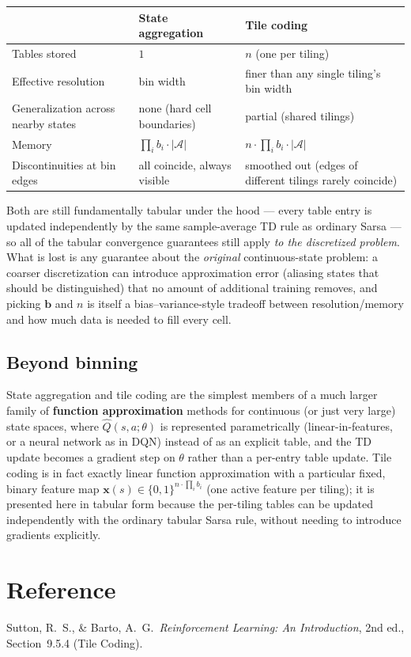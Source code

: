 \documentclass[11pt]{article}
\begin{document}
\begin{center}
\begin{tabular}{@{}p{4.1cm}p{4.6cm}p{4.6cm}@{}}
\toprule
 & State aggregation & Tile coding \\
\midrule
Tables stored & $1$ & $n$ (one per tiling) \\
Effective resolution & bin width & finer than any single tiling's bin width \\
Generalization across nearby states & none (hard cell boundaries) & partial (shared tilings) \\
Memory & $\prod_i b_i \cdot |\mathcal{A}|$ & $n \cdot \prod_i b_i \cdot |\mathcal{A}|$ \\
Discontinuities at bin edges & all coincide, always visible & smoothed out (edges of different tilings rarely coincide) \\
\bottomrule
\end{tabular}
\end{center}

Both are still fundamentally tabular under the hood — every table entry is
updated independently by the same sample-average TD rule as ordinary
Sarsa — so all of the tabular convergence guarantees still apply
\emph{to the discretized problem}. What is lost is any guarantee about the
\emph{original} continuous-state problem: a coarser discretization can
introduce approximation error (aliasing states that should be
distinguished) that no amount of additional training removes, and picking
$\mathbf{b}$ and $n$ is itself a bias--variance-style tradeoff between
resolution/memory and how much data is needed to fill every cell.

\subsection{Beyond binning}

State aggregation and tile coding are the simplest members of a much
larger family of \textbf{function approximation} methods for continuous
(or just very large) state spaces, where $\hat{Q}(s,a;\theta)$ is
represented parametrically (linear-in-features, or a neural network as in
DQN) instead of as an explicit table, and the TD update becomes a gradient
step on $\theta$ rather than a per-entry table update. Tile coding is in
fact exactly linear function approximation with a particular fixed,
binary feature map $\mathbf{x}(s) \in \{0,1\}^{n \cdot \prod_i b_i}$ (one
active feature per tiling); it is presented here in tabular form because
the per-tiling tables can be updated independently with the ordinary
tabular Sarsa rule, without needing to introduce gradients explicitly.

\section{Reference}

Sutton, R.\ S., \& Barto, A.\ G.\ \emph{Reinforcement Learning: An
Introduction}, 2nd ed., Section~9.5.4 (Tile Coding).
\end{document}
